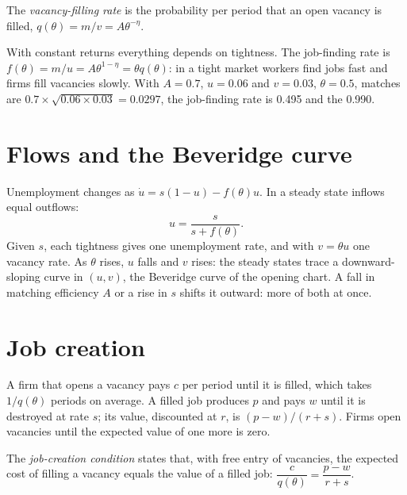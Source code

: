 \begin{definition}\label{def:b2:search-and-unemployment:vacancy-filling}
The \emph{vacancy-filling rate} is the probability per period that an open vacancy is filled,
$q(\theta) = m/v = A\theta^{-\eta}$.
\end{definition}

With constant returns everything depends on tightness. The job-finding rate is $f(\theta) = m/u = A\theta^{1-\eta} = \theta q(\theta)$: in a tight market workers find jobs fast and firms fill vacancies
slowly. With $A = 0.7$, $u = 0.06$ and $v = 0.03$, $\theta = 0.5$, matches are $0.7 \times \sqrt{0.06 \times 0.03} = 0.0297$, the job-finding rate is 0.495 and the  0.990.

\section{Flows and the Beveridge curve}\label{sec:b2:search-and-unemployment:beveridge}

Unemployment changes as $\dot u = s(1 - u) - f(\theta)u$. In a steady state inflows equal outflows:
\begin{equation}\label{eq:b2:search-and-unemployment:bc}
u = \frac{s}{s + f(\theta)}.
\end{equation}
Given $s$, each tightness gives one unemployment rate, and with $v = \theta u$ one vacancy rate. As $\theta$ rises, $u$ falls and $v$ rises: the steady states
trace a downward-sloping curve in $(u, v)$, the Beveridge curve of the opening chart. A fall in matching efficiency $A$ or a rise in $s$ shifts it
outward: more of both at once.

\section{Job creation}\label{sec:b2:search-and-unemployment:job-creation}

A firm that opens a vacancy pays $c$ per period until it is filled, which takes $1/q(\theta)$ periods on average. A filled job produces $p$ and pays $w$ until it
is destroyed at rate $s$; its value, discounted at $r$, is $(p - w)/(r + s)$. Firms open vacancies until the expected value of one more is zero.

\begin{definition}\label{def:b2:search-and-unemployment:job-creation}
The \emph{job-creation condition} states that, with free entry of vacancies, the expected cost of filling a vacancy equals the value of a filled job:
$\dfrac{c}{q(\theta)} = \dfrac{p - w}{r + s}$.
\end{definition}

